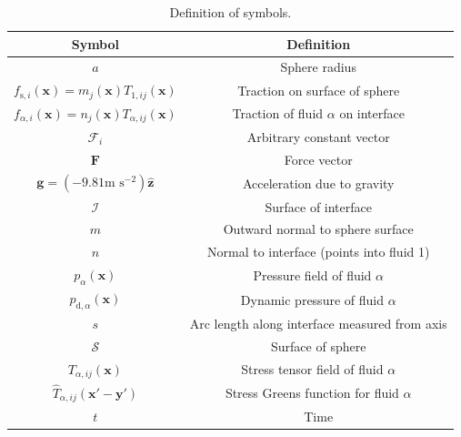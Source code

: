 \documentclass[12pt]{article}
\begin{document}
    \begin{longtable}{|c|c|}
    \caption{Definition of symbols. \label{tab:symbols}} \\ %
    \hline
    Symbol & Definition \\  
    \hline %
    $a$                                                               & Sphere radius           \\
    $f_{\text{s},i}(\mathbf{x}) = m_{j}(\mathbf{x})T_{1,ij}(\mathbf{x})$   &Traction on surface of sphere \\
    $f_{\alpha,i}(\mathbf{x}) = n_{j}(\mathbf{x})T_{\alpha,ij}(\mathbf{x})$ & Traction of fluid $\alpha$ on interface \\
    $\mathcal{F}_{i}$                                                  & Arbitrary constant vector \\
    $\boldsymbol{F}$                                                  & Force vector \\
    $\mathbf{g} = (-9.81 \text{m s}^{-2}) \mathbf{\hat{z}}$            & Acceleration due to gravity \\      
    $\mathcal{I}$                                                     & Surface of interface \\
    $m$                                                               & Outward normal to sphere surface \\
    $n$                                                               & Normal to interface (points into fluid 1) \\
    $p_{\alpha}(\mathbf{x})$                                            & Pressure field of fluid $\alpha$ \\
    $p_{\text{d},\alpha}(\mathbf{x}) $                                    & Dynamic pressure of fluid $\alpha$ \\
    $s$                                                               & Arc length along interface measured from axis \\
    $\mathcal{S}$                                                     & Surface of sphere \\
    $T_{\alpha,ij}(\mathbf{x})$                                          & Stress tensor field of fluid $\alpha$ \\
    $\hat{T}_{\alpha,ij}(\boldsymbol{x'} - \boldsymbol{y'})$             & Stress Greens function for fluid $\alpha$ \\
    $t$                                                               & Time \\

\end{longtable}
\end{document}
